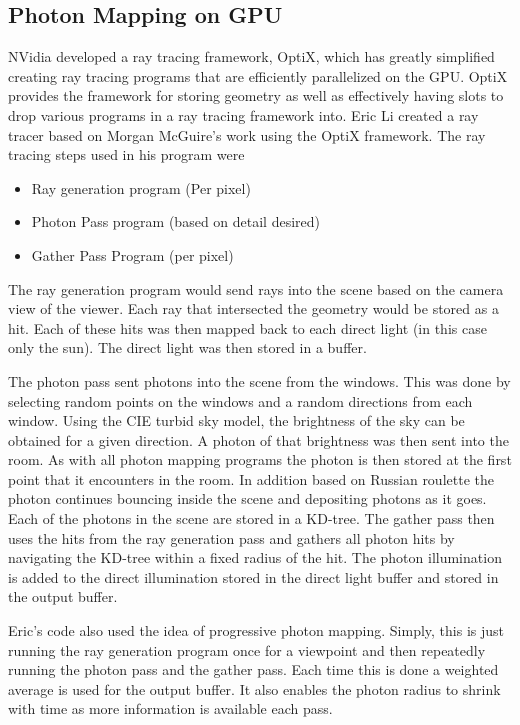  \subsection{Photon Mapping on GPU}
  NVidia developed a ray tracing framework, OptiX, which has greatly simplified creating ray tracing programs that are efficiently parallelized on the GPU.  OptiX provides the framework for storing geometry as well as effectively having slots to drop various programs in a ray tracing framework into.  Eric Li created a ray tracer based on Morgan McGuire's work using the OptiX framework.  The ray tracing steps used in his program were
  \begin{itemize}
    \item Ray generation program (Per pixel)
    \item Photon Pass program (based on detail desired)
    \item Gather Pass Program (per pixel)
  \end{itemize}
  The ray generation program would send rays into the scene based on the camera view of the viewer.  Each ray that intersected the geometry would be stored as a hit.  Each of these hits was then mapped back to each direct light (in this case only the sun).  The direct light was then stored in a buffer.
  
  The photon pass sent photons into the scene from the windows.  This was done by selecting random points on the windows and a random directions from each window.  Using the CIE turbid sky model, the brightness of the sky can be obtained for a given direction.  A photon of that brightness was then sent into the room.  As with all photon mapping programs the photon is then stored at the first point that it encounters in the room.  In addition based on Russian roulette  the photon continues bouncing inside the scene and depositing photons as it goes.  Each of the photons in the scene are stored in a KD-tree.  The gather pass then uses the hits from the ray generation pass and gathers all photon hits by navigating the KD-tree within a fixed radius of the hit.  The photon illumination is added to the direct illumination stored in the direct light buffer and stored in the output buffer.
  
  Eric's code also used the idea of progressive photon mapping.  Simply, this is just running the ray generation program once for a viewpoint and then repeatedly running the photon pass and the gather pass.  Each time this is done a weighted average is used for the output buffer.  It also enables the photon radius to shrink with time as more information is available each pass.
  
